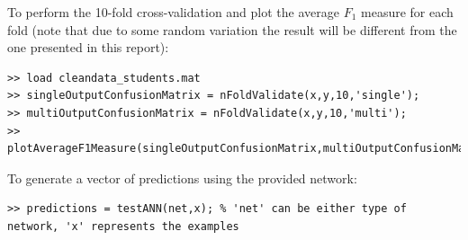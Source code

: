 \documentclass[a4paper]{article}
\begin{document}
To perform the 10-fold cross-validation and plot the average $F_1$ measure for each fold (note that due to some random variation the result will be different from the one presented in this report):
\begin{lstlisting}
>> load cleandata_students.mat
>> singleOutputConfusionMatrix = nFoldValidate(x,y,10,'single');
>> multiOutputConfusionMatrix = nFoldValidate(x,y,10,'multi');
>> plotAverageF1Measure(singleOutputConfusionMatrix,multiOutputConfusionMatrix);
\end{lstlisting}

To generate a vector of predictions using the provided network:
\begin{lstlisting}
>> predictions = testANN(net,x); % 'net' can be either type of network, 'x' represents the examples
\end{lstlisting}

\clearpage

\end{document}
